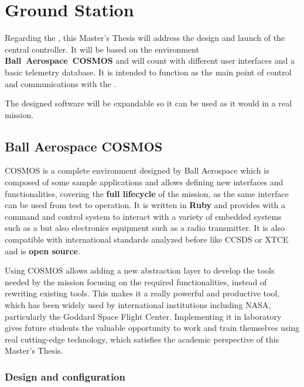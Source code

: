 \section{Ground Station}

Regarding the , this Master's Thesis will address the design and launch of the central controller. It will be based on the environment \textbf{Ball~Aerospace~COSMOS} and will count with different user interfaces and a basic telemetry database. It is intended to function as the main point of control and communications with the .

The designed  software will be expandable so it can be used as it would in a real mission.

\subsection{Ball Aerospace COSMOS} \label{cosmosgs}

COSMOS is a complete environment designed by Ball Aerospace which is composed of some sample applications and allows defining new interfaces and functionalities, covering the \textbf{full lifecycle} of the mission, as the same interface can be used from test to operation. It is written in \textbf{Ruby} and provides with a command and control system to interact with a variety of embedded systems such as a  but also electronics equipment such as a radio transmitter.  It is also compatible with international standards analyzed before like \acrshort{CCSDS} or \acrshort{XTCE} and is \textbf{open source}.


Using COSMOS allows adding a new abstraction layer to develop the tools needed by the mission focusing on the required functionalities, instead of rewriting existing tools. This makes it a really powerful and productive tool, which has been widely used by international institutions including \acrshort{NASA}, particularly the Goddard Space Flight Center. Implementing it in  laboratory gives future students the valuable opportunity to work and train themselves using real cutting-edge technology, which satisfies the academic perspective of this Master's Thesis.

\vspace{-0.5cm}
\subsubsection{Design and configuration}

